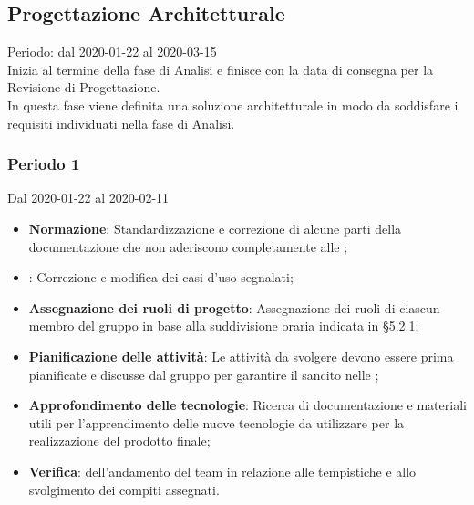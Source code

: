 \subsection{Progettazione Architetturale}
Periodo: dal 2020-01-22 al 2020-03-15\\
Inizia al termine della fase di Analisi e finisce con la data di consegna per la Revisione di Progettazione.\\
In questa fase viene definita una soluzione architetturale in modo da soddisfare i requisiti individuati nella fase di Analisi.

\subsubsection{Periodo 1} 
Dal 2020-01-22 al 2020-02-11
\begin{itemize}
	\item \textbf{Normazione}: Standardizzazione e correzione di alcune parti della documentazione che non aderiscono completamente alle \NdP{};
	\item \textbf{\AdR{}}: Correzione e modifica dei casi d'uso segnalati;
	\item \textbf{Assegnazione dei ruoli di progetto}: Assegnazione dei ruoli di ciascun membro del gruppo in base alla suddivisione oraria indicata in §5.2.1;
	\item \textbf{Pianificazione delle attività}: Le attività da svolgere devono essere prima pianificate e discusse dal gruppo per garantire il  sancito nelle \NdP{};
	\item \textbf{Approfondimento delle tecnologie}: Ricerca di documentazione e materiali utili per l'apprendimento delle nuove tecnologie da utilizzare per la realizzazione del prodotto finale;
	\item \textbf{Verifica}:  dell'andamento del team in relazione alle tempistiche e allo svolgimento dei compiti assegnati.
\end{itemize}

